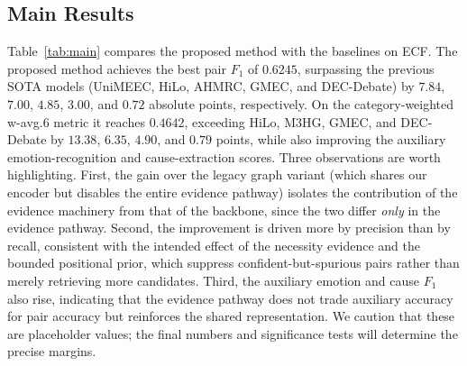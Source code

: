 \documentclass[journal]{IEEEtran}
\begin{document}
\subsection{Main Results}
Table~\ref{tab:main} compares the proposed method with the baselines on ECF. The proposed
method achieves the best pair $F_1$ of $0.6245$, surpassing the previous SOTA models
(UniMEEC, HiLo, AHMRC, GMEC, and DEC-Debate) by $7.84$, $7.00$, $4.85$, $3.00$, and $0.72$
absolute points, respectively. On the category-weighted w-avg.6 metric it reaches $0.4642$,
exceeding HiLo, M3HG, GMEC, and DEC-Debate by $13.38$, $6.35$, $4.90$, and $0.79$ points,
while also improving the auxiliary emotion-recognition and cause-extraction scores.
Three observations are worth highlighting. First, the gain over the legacy graph variant
(which shares our encoder but disables the entire evidence pathway) isolates the
contribution of the evidence machinery from that of the backbone, since the two differ
\emph{only} in the evidence pathway. Second, the improvement is driven more by precision
than by recall, consistent with the intended effect of the necessity evidence and the
bounded positional prior, which suppress confident-but-spurious pairs rather than merely
retrieving more candidates. Third, the auxiliary emotion and cause $F_1$ also rise, indicating
that the evidence pathway does not trade auxiliary accuracy for pair accuracy but reinforces
the shared representation. We caution that these are placeholder values; the final numbers
and significance tests will determine the precise margins.
\end{document}

